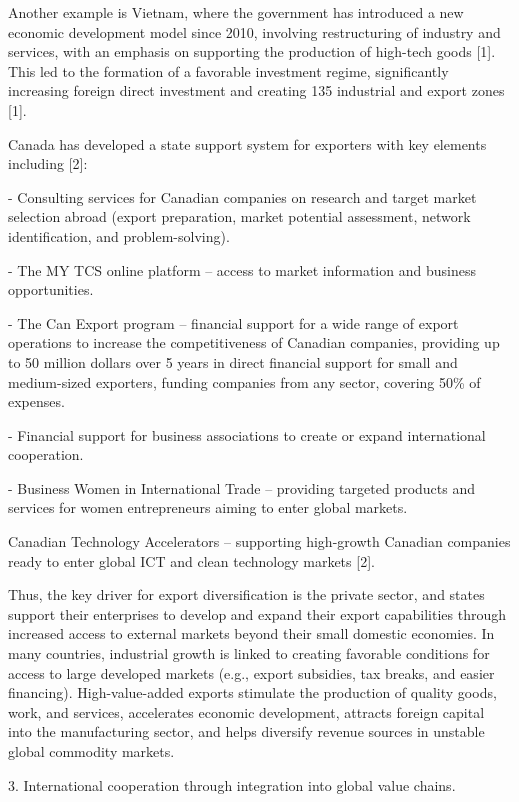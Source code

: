 \begin{multicols}{2}
Another example is Vietnam, where the government has introduced a new
economic development model since 2010, involving restructuring of
industry and services, with an emphasis on supporting the production of
high-tech goods {[}1{]}. This led to the formation of a favorable
investment regime, significantly increasing foreign direct investment
and creating 135 industrial and export zones {[}1{]}.

Canada has developed a state support system for exporters with key
elements including {[}2{]}:

- Consulting services for Canadian companies on research and target
market selection abroad (export preparation, market potential
assessment, network identification, and problem-solving).

- The MY TCS online platform -- access to market information and
business opportunities.

- The Can Export program -- financial support for a wide range of export
operations to increase the competitiveness of Canadian companies,
providing up to 50 million dollars over 5 years in direct financial
support for small and medium-sized exporters, funding companies from any
sector, covering 50\% of expenses.

- Financial support for business associations to create or expand
international cooperation.

- Business Women in International Trade -- providing targeted products
and services for women entrepreneurs aiming to enter global markets.

Canadian Technology Accelerators -- supporting high-growth Canadian
companies ready to enter global ICT and clean technology markets
{[}2{]}.

Thus, the key driver for export diversification is the private sector,
and states support their enterprises to develop and expand their export
capabilities through increased access to external markets beyond their
small domestic economies. In many countries, industrial growth is linked
to creating favorable conditions for access to large developed markets
(e.g., export subsidies, tax breaks, and easier financing).
High-value-added exports stimulate the production of quality goods,
work, and services, accelerates economic development, attracts foreign
capital into the manufacturing sector, and helps diversify revenue
sources in unstable global commodity markets.

3. International cooperation through integration into global value
chains.


\end{multicols}
